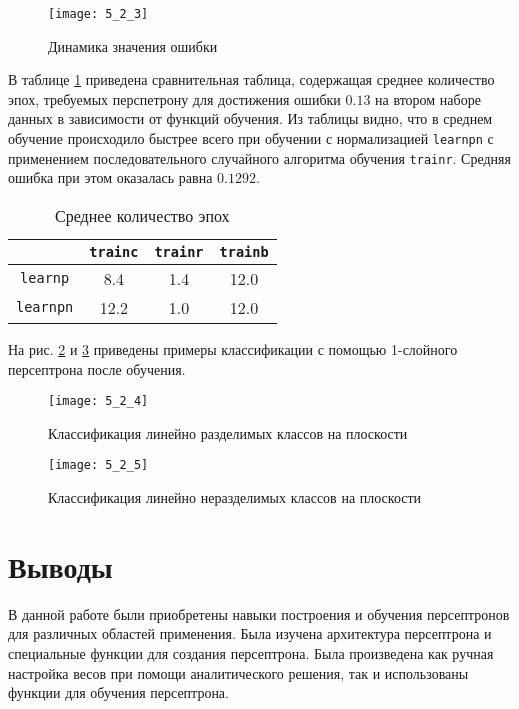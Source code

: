 \begin{figure}[H]
\begin{center}
	\texttt{[image: 5\_2\_3]}
	\caption{Динамика значения ошибки}
	\label{fig:5_2_3}
\end{center}
\end{figure}

В таблице \ref{tab:6_2_2} приведена сравнительная таблица, содержащая среднее количество эпох, требуемых перспетрону для достижения ошибки $0.13$ на втором наборе данных в зависимости от функций обучения. Из таблицы видно, что в среднем обучение происходило быстрее всего при обучении с нормализацией \verb+learnpn+ с применением последовательного случайного алгоритма обучения \verb+trainr+. Средняя ошибка при этом оказалась равна $0.1292$.

\begin{table}[H]
\begin{center}
	\def\tabcolsep{15pt}
	\caption{Среднее количество эпох}
	\label{tab:6_2_2}
	\begin{tabular}{|c|c|c|c|}
		\hline
		 & \verb+trainc+ & \verb+trainr+ & \verb+trainb+ \\
		\hline
		\verb+learnp+ & 8.4 & 1.4 & 12.0 \\
		\hline
		\verb+learnpn+ & 12.2 & 1.0 & 12.0 \\
		\hline
	\end{tabular}
\end{center}
\end{table} 

На рис. \ref{fig:5_2_4} и \ref{fig:5_2_5} приведены примеры классификации с помощью 1-слойного персептрона после обучения.
\begin{figure}[H]
\begin{center}
	\texttt{[image: 5\_2\_4]}
	\caption{Классификация линейно разделимых классов на плоскости}
	\label{fig:5_2_4}
\end{center}
\end{figure}
\vspace{-1cm}
\begin{figure}[H]
\begin{center}
	\texttt{[image: 5\_2\_5]}
	\caption{Классификация линейно неразделимых классов на плоскости}
	\label{fig:5_2_5}
\end{center}
\end{figure}

\section{Выводы}

В данной работе были приобретены навыки построения и обучения персептронов для различных областей применения. Была изучена архитектура персептрона и специальные функции для создания персептрона. Была произведена как ручная настройка весов при помощи аналитического решения, так и использованы функции для обучения персептрона. 

